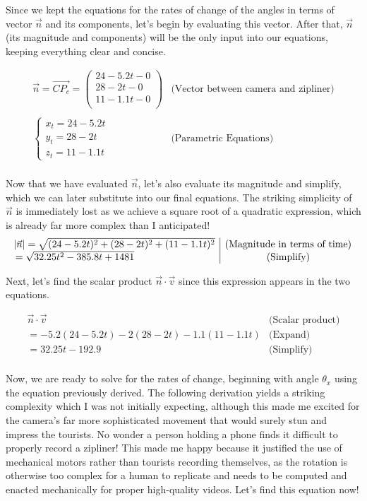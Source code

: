 \documentclass[12pt]{article}
\begin{document}
Since we kept the equations for the rates of change of the angles in terms of vector $\vec n$ and its components, let's begin by evaluating this vector. After that, $\vec n$ (its magnitude and components) will be the only input into our equations, keeping everything clear and concise.

$$
\begin{array}{c|c}
    \vec n = \overrightarrow{CP_c} =  \begin{pmatrix} 24 -5.2t - 0 \\ 28 -2t - 0 \\ 11-1.1t -0 \\ \end{pmatrix} & \text{(Vector between camera and zipliner)} \\ \\
    \begin{cases}
      x_t = 24-5.2t \\
      y_t = 28-2t \\
      z_t = 11-1.1t 
    \end{cases} & \text{(Parametric Equations)} \\
 \end{array} 
$$

Now that we have evaluated $\vec n$, let's also evaluate its magnitude and simplify, which we can later substitute into our final equations. The striking simplicity of $\vec n$ is immediately lost as we achieve a square root of a quadratic expression, which is already far more complex than I anticipated!
$$
\begin{array}{l|c}
    \abs{\vec n} = \sqrt{(24-5.2t)^2+(28-2t)^2+(11-1.1t)^2} & \text{(Magnitude in terms of time)} \\
    = \sqrt{32.25t^2 - 385.8t + 1481} & \text{(Simplify)} \\
 \end{array} 
$$

Next, let's find the scalar product $\vec n \cdot \vec v$ since this expression appears in the two equations.

$$
\begin{array}{l|c}
    \vec n \cdot \vec v & \text{(Scalar product)} \\
    = -5.2(24-5.2t) - 2(28-2t) - 1.1(11-1.1t) & \text{(Expand)}\\
    = 32.25t-192.9& \text{(Simplify)}\\
 \end{array} 
$$

\vspace{20pt}
Now, we are ready to solve for the rates of change, beginning with angle $\theta_x$ using the equation previously derived. The following derivation yields a striking complexity which I was not initially expecting, although this made me excited for the camera's far more sophisticated movement that would surely stun and impress the tourists. No wonder a person holding a phone finds it difficult to properly record a zipliner! This made me happy because it justified the use of mechanical motors rather than tourists recording themselves, as the rotation is otherwise too complex for a human to replicate and needs to be computed and enacted mechanically for proper high-quality videos. Let's find this equation now!
\end{document}
